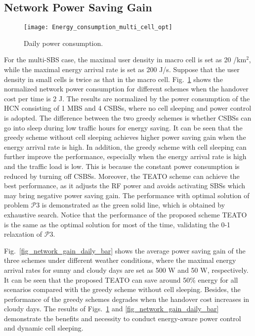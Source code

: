 \documentclass[12pt, draftclsnofoot,onecolumn]{IEEEtran}
\begin{document}
\subsection{Network Power Saving Gain}

\begin{figure}[t]
	\centering
	\texttt{[image: Energy\_consumption\_multi\_cell\_opt]}
	\caption{Daily power consumption.}\label{fig_network_gain_daily}
\end{figure}

For the multi-SBS case, the maximal user density in macro cell is set as 20 /km$^2$, while the maximal energy arrival rate is set as 200 J/s.
Suppose that the user density in small cells is twice as that in the macro cell. Fig.~\ref{fig_network_gain_daily} shows the normalized network power consumption for different schemes when the handover cost per time is 2 J.
The results are normalized by the power consumption of the HCN consisting of 1 MBS and 4 CSBSs, where no cell sleeping and power control is adopted. The difference between the two greedy schemes is whether CSBSs can go into sleep during low traffic hours for energy saving.
It can be seen that the greedy scheme without cell sleeping achieves higher power saving gain when the energy arrival rate is high.
In addition, the greedy scheme with cell sleeping can further improve the performance, especially when the energy arrival rate is high and the traffic load is low.
This is because the constant power consumption is reduced by turning off CSBSs.
Moreover, the TEATO scheme can achieve the best performance, as it adjusts the RF power and avoids activating SBSs which may bring negative power saving gain.
The performance with optimal solution of problem $\mathcal{P}3$ is demonstrated as the green solid line, which is obtained by exhaustive search.
Notice that the performance of the proposed scheme TEATO is the same as the optimal solution for most of the time, validating the 0-1 relaxation of $\mathcal{P}3$.

Fig.~\ref{fig_network_gain_daily_bar} shows the average power saving gain of the three schemes under different weather conditions, where the maximal energy arrival rates for sunny and cloudy days are set as 500 W and 50 W, respectively. It can be seen that the proposed TEATO can save around 50\% energy for all scenarios compared with the greedy scheme without cell sleeping.
Besides, the performance of the greedy schemes degrades when the handover cost increases in cloudy days.
The results of Figs.~\ref{fig_network_gain_daily} and \ref{fig_network_gain_daily_bar} demonstrate the benefits and necessity to conduct energy-aware power control and dynamic cell sleeping.
\end{document}

